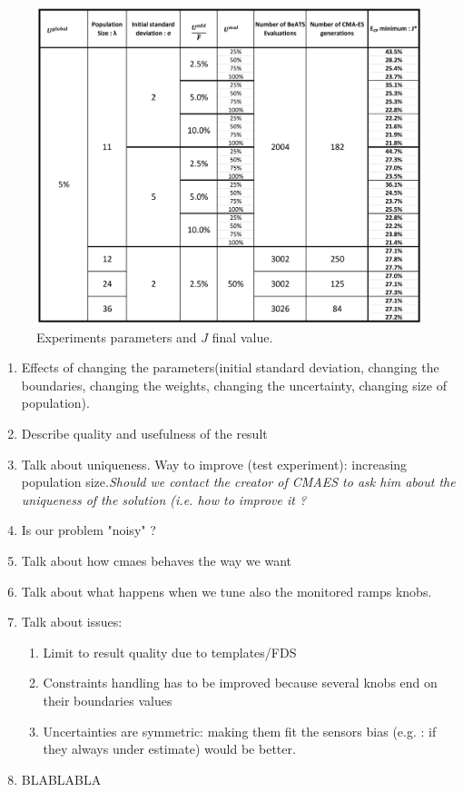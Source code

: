 \begin{figure}
\centering
	\label{fig:results_array}
	\caption{Experiments parameters and $J$ final value.}
	\includegraphics[width=7in]{figures/results_array.png}
\end{figure}




\begin{enumerate}
	\item Effects of changing the parameters(initial standard deviation, changing the boundaries, changing the weights, changing the uncertainty, changing size of population).
	\item Describe quality and usefulness of the result
	\item Talk about uniqueness. Way to improve (test experiment): increasing population size.\emph{Should we contact the creator of CMAES to ask him about the uniqueness of the solution (i.e. how to improve it ?}
	\item Is our problem "noisy" ?
	\item Talk about how cmaes behaves the way we want
	\item Talk about what happens when we tune also the monitored ramps knobs.	
	\item Talk about issues:
\begin{enumerate}
	\item Limit to result quality due to templates/FDS
	\item Constraints handling has to be improved because several knobs end on their boundaries values\
	\item Uncertainties are symmetric: making them fit the sensors bias (e.g. : if they always under estimate) would be better.
\end{enumerate}
	\item BLABLABLA
\end{enumerate} 
